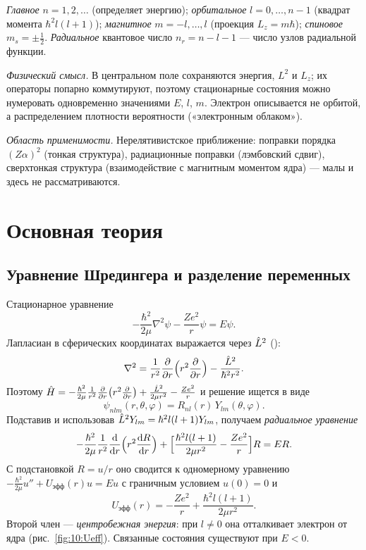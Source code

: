 \begin{definition}
\emph{Главное} $n=1,2,\dots$ (определяет энергию); \emph{орбитальное} $l=0,\dots,n-1$ (квадрат момента
$\hbar^2l(l+1)$); \emph{магнитное} $m=-l,\dots,l$ (проекция $L_z=m\hbar$); \emph{спиновое} $m_s=\pm\frac12$.
\emph{Радиальное} квантовое число $n_r=n-l-1$ — число узлов радиальной функции.
\end{definition}

\emph{Физический смысл.} В центральном поле сохраняются энергия, $L^2$ и $L_z$; их операторы попарно
коммутируют, поэтому стационарные состояния можно нумеровать одновременно значениями $E$, $l$, $m$.
Электрон описывается не орбитой, а распределением плотности вероятности («электронным облаком»).

\emph{Область применимости.} Нерелятивистское приближение: поправки порядка $(Z\alpha)^2$ (тонкая
структура), радиационные поправки (лэмбовский сдвиг), сверхтонкая структура (взаимодействие с
магнитным моментом ядра) — малы и здесь не рассматриваются.

\section{Основная теория}

\subsection{Уравнение Шредингера и разделение переменных}

Стационарное уравнение
\begin{equation}\label{eq:10:sse}
  -\frac{\hbar^2}{2\mu}\nabla^2\psi-\frac{Ze^2}{r}\psi=E\psi .
\end{equation}
Лапласиан в сферических координатах выражается через $\hat{L}^2$ ():
\begin{equation}\label{eq:10:lap}
  \nabla^2=\frac{1}{r^2}\frac{\partial }{\partial r}\Bigl(r^2\frac{\partial }{\partial r}\Bigr)-\frac{\hat{L}^2}{\hbar^2r^2}.
\end{equation}
Поэтому
\(
  \hat{H}=-\frac{\hbar^2}{2\mu}\frac{1}{r^2}\frac{\partial }{\partial r}\bigl(r^2\frac{\partial }{\partial r}\bigr)+\frac{\hat{L}^2}{2\mu r^2}-\frac{Ze^2}{r}
\)
и решение ищется в виде
\begin{equation}\label{eq:10:sep}
  \psi_{nlm}(r,\theta,\varphi)=R_{nl}(r)\,Y_{lm}(\theta,\varphi).
\end{equation}
Подставив и использовав $\hat{L}^2Y_{lm}=\hbar^2l(l+1)Y_{lm}$, получаем \emph{радиальное уравнение}
\begin{equation}\label{eq:10:radial}
  -\frac{\hbar^2}{2\mu}\frac{1}{r^2}\frac{\mathrm{d} }{\mathrm{d} r}\Bigl(r^2\frac{\mathrm{d} R}{\mathrm{d} r}\Bigr)
  +\Bigl[\frac{\hbar^2l(l+1)}{2\mu r^2}-\frac{Ze^2}{r}\Bigr]R=ER .
\end{equation}
С подстановкой $R=u/r$ оно сводится к одномерному уравнению
$-\frac{\hbar^2}{2\mu}u''+U_{\text{эфф}}(r)u=Eu$ с граничным условием $u(0)=0$ и
\begin{equation}\label{eq:10:Ueff}
  U_{\text{эфф}}(r)=-\frac{Ze^2}{r}+\frac{\hbar^2l(l+1)}{2\mu r^2}.
\end{equation}
Второй член — \emph{центробежная энергия}: при $l\neq0$ она отталкивает электрон от ядра (рис.~\ref{fig:10:Ueff}).
Связанные состояния существуют при $E<0$.

